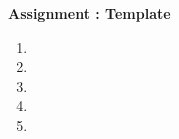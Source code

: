 \documentclass[a4 paper, 12pt]{report}
\begin{document}
\begin{center}
    \large \textbf{Assignment  : Template}
\end{center}
    

\begin{enumerate}
    
    \item 
    
    \item 
    
    \item 
    
    \item 
    
    \item 
    
\end{enumerate}
\end{document}
